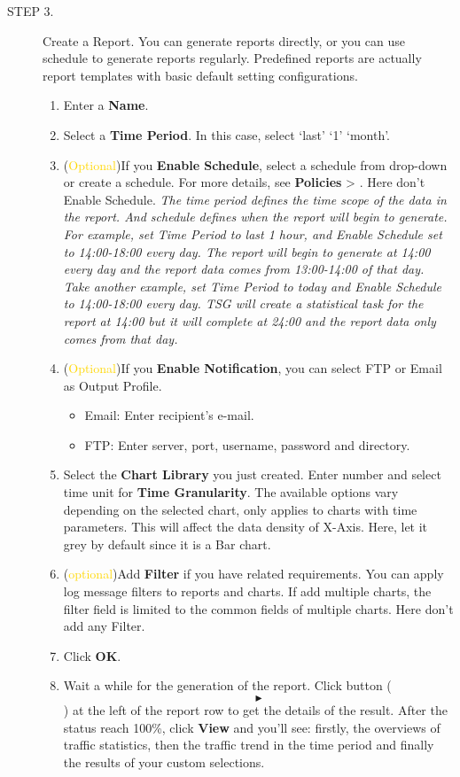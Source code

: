 \begin{description}
    \item[STEP 3.]	Create a Report. You can generate reports directly, or you can use schedule to generate reports regularly. Predefined reports are actually report templates with basic default setting configurations.
    \begin{enumerate}
        \item  Enter a \textbf{Name}.
        \item Select a \textbf{Time Period}. In this case, select ‘last’ ‘1’ ‘month’.
        \item (\textcolor{gold}{Optional})If you \textbf{Enable Schedule}, select a schedule from drop-down or create a schedule. For more details, see \textbf{Policies} > \textbf{\hyperlink{link:Schedules}{\color{linkblue}{Schedules}}}. Here don’t Enable Schedule.
        \notemark\textit{The time period defines the time scope of the data in the report. And schedule defines when the report will begin to generate. For example, set Time Period to last 1 hour, and Enable Schedule set to 14:00-18:00 every day. The report will begin to generate at 14:00 every day and the report data comes from 13:00-14:00 of that day. Take another example, set Time Period to today and Enable Schedule to 14:00-18:00 every day. TSG will create a statistical task for the report at 14:00 but it will complete at 24:00 and the report data only comes from that day.}
        \item (\textcolor{gold}{Optional})If you \textbf{Enable Notification}, you can select FTP or Email as Output Profile. 
        \begin{itemize}
            \item Email: Enter recipient's e-mail.
            \item FTP: Enter server, port, username, password and directory.
        \end{itemize}
        \item Select the \textbf{Chart Library} you just created. Enter number and select time unit for \textbf{Time Granularity}. The available options vary depending on the selected chart, only applies to charts with time parameters. This will affect the data density of X-Axis. Here, let it grey by default since it is a Bar chart.
        \item (\textcolor{gold}{optional})Add \textbf{Filter} if you have related requirements. You can apply log message filters to reports and charts. If add multiple charts, the filter field is limited to the common fields of multiple charts. Here don’t add any Filter.
        \item Click \textbf{OK}.
        \item Wait a while for the generation of the report. Click button (\[\blacktriangleright\]) at the left of the report row to get the details of the result. After the status reach 100\%, click \textbf{View} and you’ll see: firstly, the overviews of traffic statistics, then the traffic trend in the time period and finally the results of your custom selections. 
    \end{enumerate}


\end{description}
